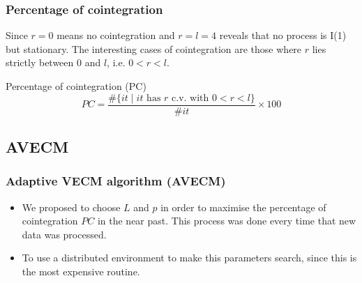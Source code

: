\documentclass{beamer}
\begin{document}
\begin{frame}
\frametitle{Percentage of cointegration}
Since $r=0$ means no cointegration and $r=l=4$ reveals that no process is I(1) but stationary.
The interesting cases of cointegration are those where $r$ lies strictly
between $0$ and $l$, i.e. $0<r<l$.
\begin{block}{Percentage of cointegration (PC)}
{\color{blue}
\begin{equation*} \label{eq:pcoint}
PC = 
\frac{\#\{ it \mid \text{$it$ has $r$ c.v. with $0<r<l$}\}}
     {\#it}\times 100
\end{equation*}}
\end{block}
\end{frame}


%
\subsection{AVECM}
\begin{frame}
\frametitle{Adaptive VECM algorithm (AVECM)}
\begin{itemize}
\item We proposed to choose $L$ and $p$ in order to maximise the percentage of
cointegration $PC$ in the near past. This process was done every time that new data was processed. 
\item To use a distributed environment to make this parameters search, since this is the most expensive routine.
\end{itemize}
\end{frame}
\end{document}
